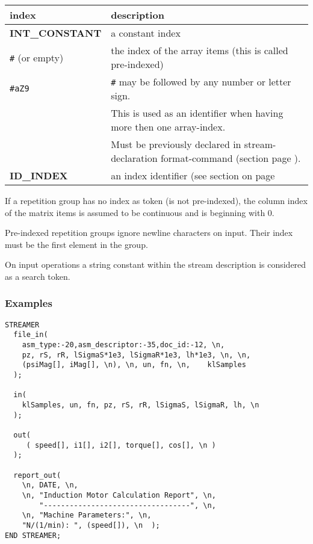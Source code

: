 
\label{par:st_field_indizes}

\begin{tabularx}{\textwidth}{l|X}
index             & description \\
\hline
{\bfseries INT\_CONSTANT} & a constant index \\
\verb+#+ (or empty) & the index of the array items (this is called pre-indexed) \\
\verb+#aZ9+       & \verb+#+ may be followed by any number or letter sign. \\
                  & This is used as an identifier when having more then one array-index. \\
                  & Must be previously declared in stream-declaration format-command (section \nameref{fig:st_format_command} page \pageref{fig:st_format_command}). \\
{\bfseries ID\_INDEX} & an index identifier (see section \nameref{sec:uiindex} on page \pageref{sec:uiindex} \\
\end{tabularx}
\vspace{0.5cm}

If a repetition group has no index as token
(is not pre-indexed), the column index of the matrix items
is assumed to be continuous and is beginning with 0.

Pre-indexed repetition groups ignore newline characters on input.
Their index must be the first element in the group.

On input operations a string constant within the stream description is
considered as a search token.


\vspace{1cm}


\subsubsection{Examples}
\label{sec:stexamples}


\begin{boxedminipage}[t]{\linewidth}
\begin{verbatim}
STREAMER
  file_in(
    asm_type:-20,asm_descriptor:-35,doc_id:-12, \n,
    pz, rS, rR, lSigmaS*1e3, lSigmaR*1e3, lh*1e3, \n, \n,
    (psiMag[], iMag[], \n), \n, un, fn, \n,    klSamples
  );

  in(
    klSamples, un, fn, pz, rS, rR, lSigmaS, lSigmaR, lh, \n
  );

  out(
     ( speed[], i1[], i2[], torque[], cos[], \n )
  );

  report_out(
    \n, DATE, \n,
    \n, "Induction Motor Calculation Report", \n,
        "----------------------------------", \n,
    \n, "Machine Parameters:", \n,
    "N/(1/min): ", (speed[]), \n  );
END STREAMER;
\end{verbatim}
\end{boxedminipage}



